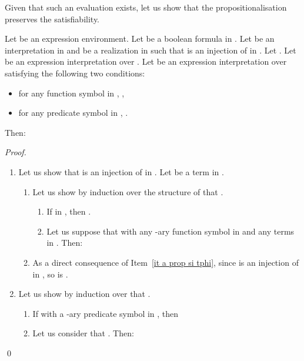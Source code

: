 \documentclass[a4paper]{llncs}
\begin{document}
  Given that such an evaluation exists, let us show that the propositionalisation preserves the satisfiability.
  
  \begin{proposition}\label{prop si tphi sat phi aussi}
    Let  be an expression environment. 
    Let  be a boolean formula in . 
    Let  be an interpretation in  and  be a realization in  such that  is an injection of  in . 
    Let . 
    Let  be an expression interpretation over .    
    Let  be an expression interpretation over  satisfying the  following two conditions:
      \begin{itemize}
        \item for any function symbol  in , ,
        \item for any predicate symbol  in ,   .
      \end{itemize}
    
    Then:
           
  \end{proposition}
  \begin{proof} 
  \begin{enumerate}
    \item Let us show that  is an injection of  in . Let  be a term in . 
    \begin{enumerate}
      \item\label{it a prop si tphi} Let us show by induction over the structure of  that .
      \begin{enumerate}
        \item If  in , then .
        \item Let us suppose that  with  any -ary function symbol in  and  any  terms in . Then:
          
      \end{enumerate}  
      \item As a direct consequence of Item~\ref{it a prop si tphi}, since  is an injection of  in , so is .
    \end{enumerate}
    \item  Let us show by induction over  that .
    \begin{enumerate}
      \item If  with  a -ary predicate symbol in , then 
      
      \item Let us consider that . Then:
        
    \end{enumerate} 
    \end{enumerate}
    \qed
  \end{proof}
  
\end{document}
